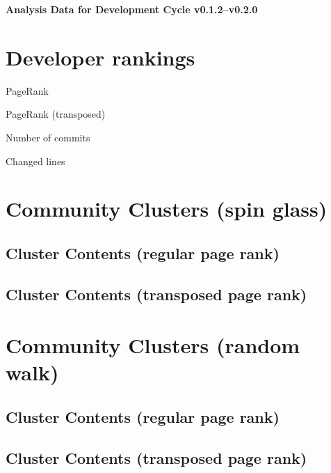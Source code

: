 \documentclass{article}
\begin{document}
\setlength{\parindent}{0pt}
\begin{center}
\begin{Large}
\textbf{Analysis Data for Development Cycle v0.1.2--v0.2.0}
\end{Large}
\end{center}
\section{Developer rankings}
\begin{small}\renewcommand{\tabcolsep}{1pt}
\begin{minipage}{0.5\linewidth}
PageRank\\

\end{minipage}%
\begin{minipage}{0.5\linewidth}
PageRank (transposed)\\

\end{minipage}

\renewcommand{\tabcolsep}{5pt}
\begin{minipage}{0.5\linewidth}
Number of commits\\

\end{minipage}%
\begin{minipage}{0.5\linewidth}
Changed lines\\

\end{minipage}
\end{small}
\newpage\section{Community Clusters (spin glass)}
\subsection{Cluster Contents (regular page rank)}
\newpage\subsection{Cluster Contents (transposed page rank)}
\newpage\section{Community Clusters (random walk)}
\subsection{Cluster Contents (regular page rank)}
\newpage\subsection{Cluster Contents (transposed page rank)}
\end{document}
